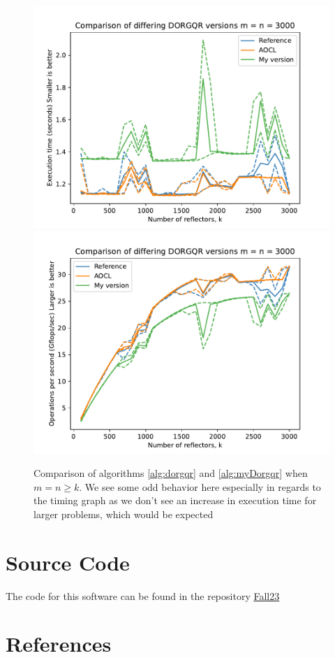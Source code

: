 \documentclass[12pt]{article}
\begin{document}
    \begin{figure}
        \centering
            \includegraphics[width=.45\textwidth]{figures/timeDORGQRSquare.pdf}
            \includegraphics[width=.45\textwidth]{figures/flopDORGQRSquare.pdf}
        \caption{Comparison of algorithms \ref{alg:dorgqr} and \ref{alg:myDorgqr} when $m=n\geq k$. 
        We see some odd behavior here especially in regards to the timing graph as we don't see an increase 
        in execution time for larger problems, which would be expected}\label{fig:dorgqr}
    \end{figure}
    \section{Source Code}
    The code for this software can be found in the repository \href{https://github.com/jprhyne/Fall23}{Fall23}
    \section{References}
    
    
\end{document}

